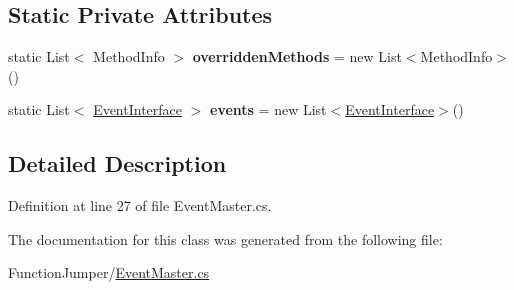 \subsection*{Static Private Attributes}
\begin{DoxyCompactItemize}
\item 
static List$<$ Method\+Info $>$ {\bfseries overridden\+Methods} = new List$<$Method\+Info$>$()\hypertarget{class_function_jumper_1_1_event_master_a8a4690c16fe028c3f92c9d3d8e3c5bd5}{}\label{class_function_jumper_1_1_event_master_a8a4690c16fe028c3f92c9d3d8e3c5bd5}

\item 
static List$<$ \hyperlink{class_function_jumper_1_1_event_interface}{Event\+Interface} $>$ {\bfseries events} = new List$<$\hyperlink{class_function_jumper_1_1_event_interface}{Event\+Interface}$>$()\hypertarget{class_function_jumper_1_1_event_master_a40a7a0fa1cf0b33feb7e1ed0609ce7f4}{}\label{class_function_jumper_1_1_event_master_a40a7a0fa1cf0b33feb7e1ed0609ce7f4}

\end{DoxyCompactItemize}


\subsection{Detailed Description}


Definition at line 27 of file Event\+Master.\+cs.



The documentation for this class was generated from the following file\+:\begin{DoxyCompactItemize}
\item 
Function\+Jumper/\hyperlink{_event_master_8cs}{Event\+Master.\+cs}\end{DoxyCompactItemize}
